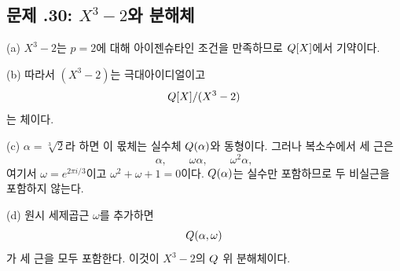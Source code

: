 \subsection*{문제 \thechapter.30: $X^3-2$와 분해체}

\begin{solution}
(a) $X^3-2$는 $p=2$에 대해 아이젠슈타인 조건을 만족하므로 $Q[X]$에서 기약이다.

(b) 따라서 $(X^3-2)$는 극대아이디얼이고
\[
 Q[X]/(X^3-2)
\]
는 체이다.

(c) $\alpha=\sqrt[3]{2}$라 하면 이 몫체는 실수체 $Q(\alpha)$와 동형이다. 그러나 복소수에서 세 근은
\[
 \alpha,\qquad \omega\alpha,\qquad \omega^2\alpha,
\]
여기서 $\omega=e^{2\pi i/3}$이고 $\omega^2+\omega+1=0$이다. $Q(\alpha)$는 실수만 포함하므로 두 비실근을 포함하지 않는다.

(d) 원시 세제곱근 $\omega$를 추가하면
\[
 Q(\alpha,\omega)
\]
가 세 근을 모두 포함한다. 이것이 $X^3-2$의 $Q$ 위 분해체이다.
\end{solution}
